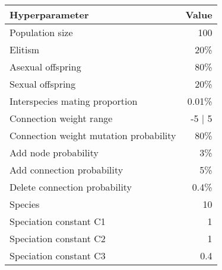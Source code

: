 

\begin{minipage}{\textwidth}
\vspace{4mm}
\begin{center}

\label{tab:neat-hyperparams} 

	\begin{tabular}{| l | r |}
		\hline
	
		\textbf{Hyperparameter} & \textbf{Value} \\ \hline
		Population size & 100 \\ \hline
		Elitism & 20\% \\ \hline
		Asexual offspring & 80\% \\ \hline
		Sexual offspring & 20\% \\ \hline
		Interspecies mating proportion & 0.01\% \\ \hline
		Connection weight range & -5 | 5 \\ \hline
		Connection weight mutation probability & 80\% \\ \hline
		Add node probability & 3\% \\ \hline
		Add connection probability & 5\% \\ \hline
		Delete connection probability & 0.4\% \\ \hline
		Species & 10 \\ \hline
		Speciation constant C1 & 1 \\ \hline
		Speciation constant C2 & 1 \\ \hline
		Speciation constant C3 & 0.4 \\ \hline
		
	\end{tabular}
\end{center}
\end{minipage}
